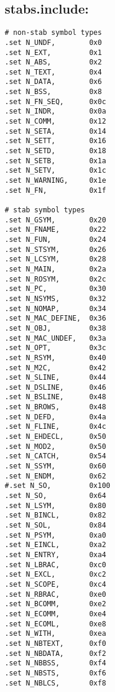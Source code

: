 \subsection{stabs.include:}
\label{anhang:stabs.include}
\begin{lstlisting}
# non-stab symbol types
.set N_UNDF,		0x0
.set N_EXT,			0x1
.set N_ABS,			0x2
.set N_TEXT,		0x4
.set N_DATA,		0x6
.set N_BSS,			0x8
.set N_FN_SEQ,		0x0c
.set N_INDR,		0x0a
.set N_COMM,		0x12
.set N_SETA,		0x14
.set N_SETT,		0x16
.set N_SETD,		0x18
.set N_SETB,		0x1a
.set N_SETV,		0x1c
.set N_WARNING,		0x1e
.set N_FN,			0x1f

# stab symbol types
.set N_GSYM,		0x20
.set N_FNAME,		0x22
.set N_FUN,			0x24
.set N_STSYM,		0x26
.set N_LCSYM,		0x28
.set N_MAIN,		0x2a
.set N_ROSYM,		0x2c
.set N_PC,			0x30
.set N_NSYMS,		0x32
.set N_NOMAP,		0x34
.set N_MAC_DEFINE,	0x36
.set N_OBJ,			0x38
.set N_MAC_UNDEF,	0x3a
.set N_OPT,			0x3c
.set N_RSYM,		0x40
.set N_M2C,			0x42
.set N_SLINE,		0x44
.set N_DSLINE,		0x46
.set N_BSLINE,		0x48
.set N_BROWS,		0x48
.set N_DEFD,		0x4a
.set N_FLINE,		0x4c
.set N_EHDECL,		0x50
.set N_MOD2,		0x50
.set N_CATCH,		0x54
.set N_SSYM,		0x60
.set N_ENDM,		0x62
#.set N_SO,			0x100
.set N_SO,			0x64
.set N_LSYM,		0x80
.set N_BINCL,		0x82
.set N_SOL,			0x84
.set N_PSYM,		0xa0
.set N_EINCL,		0xa2
.set N_ENTRY,		0xa4
.set N_LBRAC,		0xc0
.set N_EXCL,		0xc2
.set N_SCOPE,		0xc4
.set N_RBRAC,		0xe0
.set N_BCOMM,		0xe2
.set N_ECOMM,		0xe4
.set N_ECOML,		0xe8
.set N_WITH,		0xea
.set N_NBTEXT,		0xf0
.set N_NBDATA,		0xf2
.set N_NBBSS,		0xf4
.set N_NBSTS,		0xf6
.set N_NBLCS,		0xf8
\end{lstlisting}



